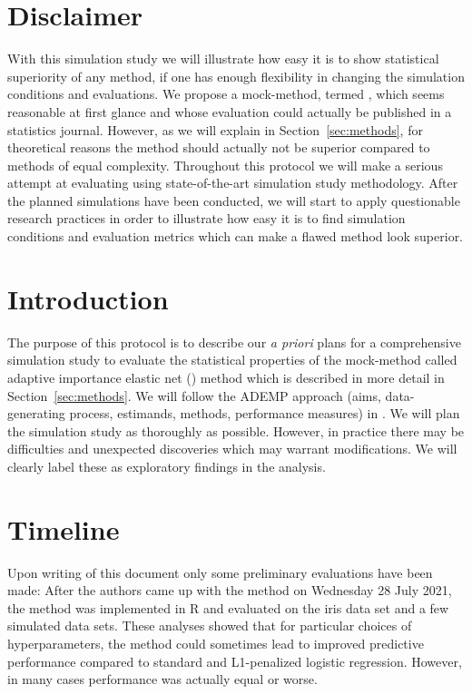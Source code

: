 \documentclass[a4paper, 11pt]{article}\usepackage[]{graphicx}\usepackage[]{color}
\title{
  \vspace{-2em}
  \textbf{\longtitle} \\
  \subtitle
}
\author{
  \textbf{\longauthors}
}
\date{\today} %
\begin{document}
\maketitle



\section{Disclaimer}
\label{sec:disclaimer}
With this simulation study we will illustrate how easy it is to show
statistical superiority of any method, if one has enough flexibility in
changing the simulation conditions and evaluations. We propose a mock-method,
termed \ainet{}, which seems reasonable at first glance and whose evaluation could actually be
published in a statistics journal. However, as we will explain in Section~\ref{sec:methods},
for theoretical reasons the method should actually not be
superior compared to methods of equal complexity. Throughout this protocol
we will make a serious attempt at evaluating \ainet{} using state-of-the-art
simulation study methodology. After the planned simulations
have been conducted, we will start to apply questionable research practices
in order to illustrate how easy it is to find simulation conditions and evaluation
metrics which can make a flawed method look superior.

\section{Introduction}
\label{sec:introduction}
The purpose of this protocol is to describe our \emph{a priori} plans for a
comprehensive simulation study to evaluate the statistical properties of the
mock-method called adaptive importance elastic net (\ainet) method which is
described in more detail in Section~\ref{sec:methods}. We will follow the ADEMP
approach (aims, data-generating process, estimands, methods, performance
measures) in \citet{Morris2019}. We will plan the simulation study as
thoroughly as possible. However, in practice there may be difficulties
and unexpected discoveries which may warrant modifications.
We will clearly label these as exploratory findings in the analysis.

\section{Timeline}
\label{sec:timeline}
Upon writing of this document only some preliminary evaluations have been made:
After the authors came up with the method on Wednesday 28 July 2021, the method
was implemented in \textsf{R} and evaluated on the iris data set and a few 
simulated data sets.
These analyses showed that for particular choices of hyperparameters, the
method could sometimes lead to improved predictive performance compared to
standard and L1-penalized logistic regression. However, in many cases
performance was actually equal or worse.
\end{document}
